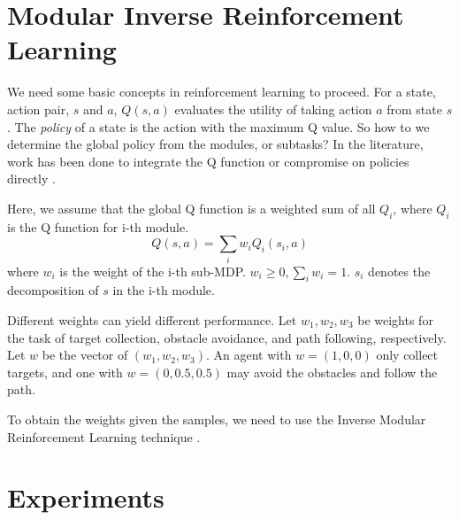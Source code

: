 \documentclass[11pt]{article} %
\begin{document}
\section{Modular Inverse Reinforcement Learning}
\label{sec:rl}

We need some basic concepts in reinforcement learning to proceed. For a state, action
pair, $s$ and $a$, $Q(s, a)$ evaluates the utility of taking action $a$ from
state $s$. The {\em policy} of a state is the action with the maximum Q
value\cite{rl}. So how to we determine the global policy from the modules, or
subtasks? In the literature, work has been done to integrate the Q function
\cite{koller1999computing} or compromise on policies directly
\cite{thomas2012motor}.

Here, we assume that the global Q function is a weighted sum of all $Q_i$, where
$Q_i$ is the Q function for i-th module.
$$Q(s, a) = \sum_i w_i Q_i (s_i, a)$$
where $w_i$ is the weight of the i-th sub-MDP. $w_i \geq 0, \sum_i w_i = 1$.
$s_i$ denotes the decomposition of $s$ in the i-th module.

Different weights can yield different performance. Let $w_1, w_2, w_3$ be
weights for the task of target collection, obstacle avoidance, and path
following, respectively. Let $w$ be the vector of $(w_1, w_2, w_3)$. An agent
with $w = (1, 0, 0)$ only collect targets, and one with $w = (0, 0.5, 0.5)$ may
avoid the obstacles and follow the path.

To obtain the weights given the samples, we need to use the Inverse Modular
Reinforcement Learning technique \cite{rothkopf2013modular}.


\section{Experiments}
\label{sec:exp}
\end{document}
